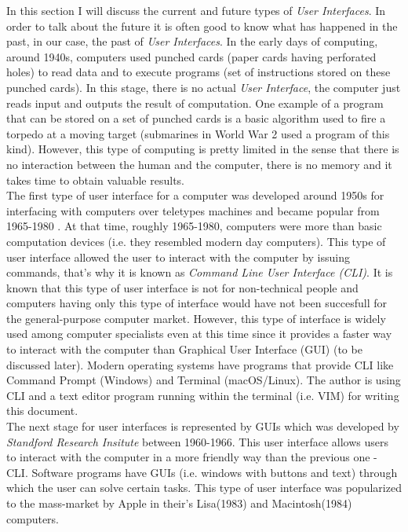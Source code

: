 \documentclass[version=last,fontsize=13pt]{scrartcl}
\begin{document}
	In this section I will discuss the current and future types of \textit{User Interfaces}. In order to talk about the future it is often good to know what has happened in the past, in our case, the past of \textit{User Interfaces}. In the early days of computing, around 1940s, computers used punched cards (paper cards having perforated holes) to read data and to execute programs (set of instructions stored on these punched cards). In this stage, there is no actual \textit{User Interface}, the computer just reads input and outputs the result of computation. One example of a program that can be stored on a set of punched cards is a basic algorithm used to fire a torpedo at a moving target (submarines in World War 2 used a program of this kind). However, this type of computing is pretty limited in the sense that there is no interaction between the human and the computer, there is no memory and it takes time to obtain valuable results. \\

	\indent 
	The first type of user interface for a computer was developed around 1950s for interfacing with computers over teletypes machines and became popular from 1965-1980  . At that time, roughly 1965-1980, computers were more than basic computation devices (i.e. they resembled modern day computers). This type of user interface allowed the user to interact with the computer by issuing commands, that's why it is known as \textit{Command Line User Interface (CLI)}. It is known that this type of user interface is not for non-technical people and computers having only this type of interface would have not been succesfull for the general-purpose computer market. However, this type of interface is widely used among computer specialists even at this time since it provides a faster way to interact with the computer than Graphical User Interface (GUI) (to be discussed later). Modern operating systems have programs that provide CLI like Command Prompt (Windows) and Terminal (macOS/Linux). The author is using CLI and a text editor program running within the terminal (i.e. VIM) for writing this document. \\

	\indent
	The next stage for user interfaces is represented by GUIs which was developed by \textit{Standford Research Insitute} between 1960-1966. This user interface allows  users to interact with the computer in a more friendly way than the previous one - CLI. Software programs have GUIs (i.e. windows with buttons and text) through which the user can  solve certain tasks. This type of user interface was popularized to the mass-market by Apple in their's Lisa(1983) and Macintosh(1984) computers.\\
\end{document}
